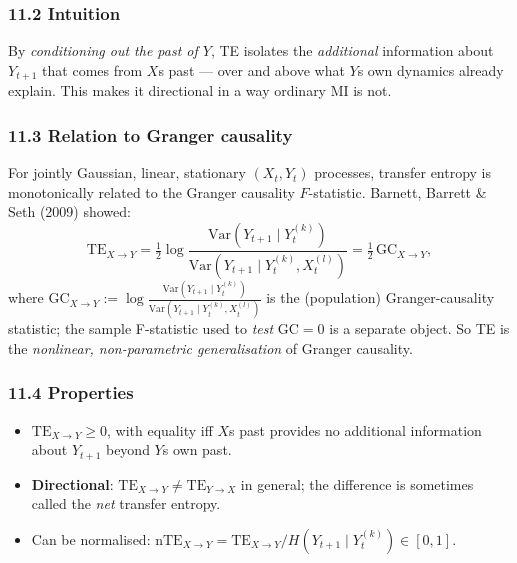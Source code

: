 \documentclass{article}
\providecommand{\tightlist}{\setlength{\itemsep}{0pt}\setlength{\parskip}{0pt}}
\begin{document}
\subsubsection{11.2 Intuition}\label{112-intuition}

By \emph{conditioning out the past of \(Y\)}, TE isolates the
\emph{additional} information about \(Y_{t+1}\) that comes from
\(X\)\textquotesingle s past --- over and above what
\(Y\)\textquotesingle s own dynamics already explain. This makes it
directional in a way ordinary MI is not.

\subsubsection{11.3 Relation to Granger
causality}\label{113-relation-to-granger-causality}

For jointly Gaussian, linear, stationary \((X_t, Y_t)\) processes,
transfer entropy is monotonically related to the Granger causality
\(F\)-statistic. Barnett, Barrett \& Seth (2009) showed: \[
\mathrm{TE}_{X \to Y} = \tfrac{1}{2} \log \frac{\mathrm{Var}(Y_{t+1} \mid Y_t^{(k)})}{\mathrm{Var}(Y_{t+1} \mid Y_t^{(k)}, X_t^{(l)})} = \tfrac{1}{2}\, \mathrm{GC}_{X \to Y},
\] where \(\mathrm{GC}_{X \to Y} := \log \frac{\mathrm{Var}(Y_{t+1} \mid Y_t^{(k)})}{\mathrm{Var}(Y_{t+1} \mid Y_t^{(k)}, X_t^{(l)})}\)
is the (population) Granger-causality statistic; the sample F-statistic
used to \emph{test} \(\mathrm{GC} = 0\) is a separate object. So TE is the
\emph{nonlinear, non-parametric generalisation} of Granger causality.

\subsubsection{11.4 Properties}\label{114-properties}

\begin{itemize}
\tightlist
\item
  \(\mathrm{TE}_{X \to Y} \geq 0\), with equality iff
  \(X\)\textquotesingle s past provides no additional information about
  \(Y_{t+1}\) beyond \(Y\)\textquotesingle s own past.
\item
  \textbf{Directional}:
  \(\mathrm{TE}_{X \to Y} \neq \mathrm{TE}_{Y \to X}\) in general; the
  difference is sometimes called the \emph{net} transfer entropy.
\item
  Can be normalised:
  \(\mathrm{nTE}_{X \to Y} = \mathrm{TE}_{X \to Y} / H(Y_{t+1} \mid Y_t^{(k)}) \in [0, 1]\).
\end{itemize}
\end{document}
